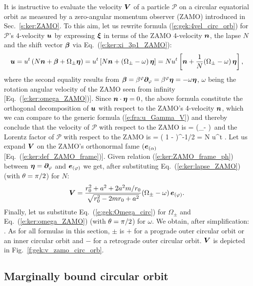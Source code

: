It is instructive to evaluate the velocity $\bm{V}$ of a particle $\mathscr{P}$
on a circular equatorial orbit as measured by a zero-angular momentum observer (ZAMO)
introduced in Sec.~\ref{s:ker:ZAMO}. To this aim, let us rewrite
formula (\ref{e:gek:4vel_circ_orb}) for $\mathscr{P}$'s 4-velocity $\bm{u}$
by expressing $\bm{\xi}$ in terms of the ZAMO 4-velocity $\bm{n}$, the lapse $N$
and the shift vector $\bm{\beta}$
via Eq.~(\ref{e:ker:xi_3p1_ZAMO}):
\[
    \bm{u} = u^t\left( N \bm{n} + \bm{\beta} + \Omega_\pm \bm{\eta} \right)
      = u^t \left[ N \bm{n} + (\Omega_\pm - \omega)\, \bm{\eta} \right]
      = N u^t \left[ \bm{n} + \frac{1}{N} (\Omega_\pm - \omega) \, \bm{\eta} \right],
\]
where the second equality results from
$\bm{\beta} = \beta^\varphi \bm{\partial}_\varphi = \beta^\varphi \bm{\eta} = - \omega \bm{\eta}$,
$\omega$ being the rotation angular velocity of the ZAMO seen from
infinity [Eq.~(\ref{e:ker:omega_ZAMO})]. Since $\bm{n}\cdot\bm{\eta} = 0$, the
above formula constitute the orthogonal decomposition of $\bm{u}$ with
respect to the ZAMO's 4-velocity $\bm{n}$, which we can compare to the generic
formula (\ref{e:fra:u_Gamma_V}) and thereby conclude that
the velocity of $\mathscr{P}$ with respect to the ZAMO is
\be
     =  (\Omega_\pm - \omega)\,  \w{\eta}
\ee
and the Lorentz factor of $\mathscr{P}$ with respect to the ZAMO is
\be
    \Gamma = ( 1 - \cdot{})^{-1/2} = N u^t .
\ee
Let us expand $\bm{V}$ on the ZAMO's orthonormal fame $(\bm{e}_{(\alpha)}$
[Eq.~(\ref{e:ker:def_ZAMO_frame})]. Given relation (\ref{e:ker:ZAMO_frame_ph})
between $\bm{\eta} = \bm{\partial}_\varphi$ and $\bm{e}_{(\varphi)}$ we get, after
substituting Eq.~(\ref{e:ker:lapse_ZAMO}) (with $\theta=\pi/2$) for $N$:
\[
  \bm{V} = \frac{r_0^2 + a^2 + 2a^2 m/r_0}{\sqrt{r_0^2 - 2 m r_0 + a^2}}
      (\Omega_\pm - \omega)\, \bm{e}_{(\varphi)} .
\]
Finally, let us substitute Eq.~(\ref{e:gek:Omega_circ}) for $\Omega_\pm$
and Eq.~(\ref{e:ker:omega_ZAMO}) (with $\theta=\pi/2$) for $\omega$. We obtain,
after simplification:
\be \label{e:gek:v_ZAMO_circ_orb}
     .
\ee
As for all formulas in this section, $\pm$ is $+$ for a prograde outer circular orbit
or an inner circular orbit and $-$ for a retrograde outer circular orbit.
$\bm{V}$ is depicted in Fig.~\ref{f:gek:v_zamo_circ_orb}.

\subsection{Marginally bound circular orbit}

